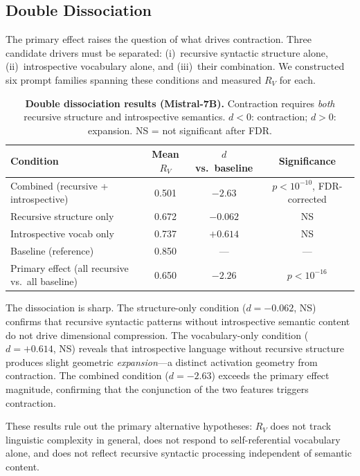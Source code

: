 \documentclass{article}
\newcommand{\RV}{R_V}
\newcommand{\dcohen}{d}
\begin{document}
\subsection{Double Dissociation}
\label{sec:dissociation}

The primary effect raises the question of what drives contraction.
Three candidate drivers must be separated: (i)~recursive syntactic structure alone,
(ii)~introspective vocabulary alone, and (iii)~their combination.
We constructed six prompt families spanning these conditions and measured $\RV$ for each.

\begin{table}[h]
\centering
\caption{\textbf{Double dissociation results (Mistral-7B).}
         Contraction requires \emph{both} recursive structure and introspective semantics.
         $\dcohen < 0$: contraction; $\dcohen > 0$: expansion. NS = not significant after FDR.}
\label{tab:dissociation}
\smallskip
\begin{tabular}{lccc}
\toprule
\textbf{Condition} & \textbf{Mean $\RV$} & \textbf{$\dcohen$ vs.\ baseline} & \textbf{Significance} \\
\midrule
Combined (recursive + introspective) & 0.501 & $-2.63$ & $p < 10^{-10}$, FDR-corrected \\
Recursive structure only             & 0.672 & $-0.062$ & NS \\
Introspective vocab only             & 0.737 & $+0.614$ & NS \\
\midrule
Baseline (reference)                 & 0.850 & --- & --- \\
Primary effect (all recursive vs.\ all baseline) & 0.650 & $-2.26$ & $p < 10^{-16}$ \\
\bottomrule
\end{tabular}
\end{table}

The dissociation is sharp.
The structure-only condition ($\dcohen = -0.062$, NS) confirms that recursive syntactic patterns
without introspective semantic content do not drive dimensional compression.
The vocabulary-only condition ($\dcohen = +0.614$, NS) reveals that introspective language
without recursive structure produces slight geometric \emph{expansion}---a distinct activation
geometry from contraction.
The combined condition ($\dcohen = -2.63$) exceeds the primary effect magnitude, confirming that
the conjunction of the two features triggers contraction.

These results rule out the primary alternative hypotheses: $\RV$ does not track linguistic
complexity in general, does not respond to self-referential vocabulary alone, and does not
reflect recursive syntactic processing independent of semantic content.
\end{document}
